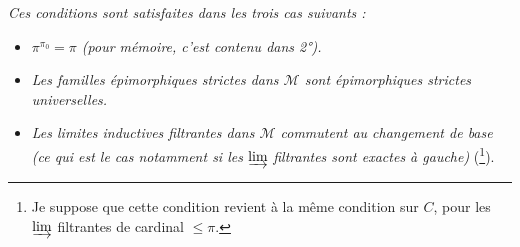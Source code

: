 \textit{Ces conditions sont satisfaites dans les trois cas suivants :}
\begin{itemize}
\item[\textit{A)}] \textit{$\pi^{\pi_0} = \pi$ (pour mémoire, c'est contenu dans 2°).}
\item[\textit{B)}] \textit{Les familles épimorphiques strictes dans $\mathcal{M}$ sont épimorphiques strictes universelles.}
\item[\textit{C)}] \textit{Les limites inductives filtrantes dans $\mathcal{M}$ commutent au changement de base (ce qui est le cas notamment si les} $\varinjlim$ \textit{filtrantes sont exactes à gauche)} (\footnote{Je suppose que cette condition revient à la même condition sur $C$, pour les $\varinjlim$ filtrantes de cardinal $\leqslant \pi$.}).
\end{itemize}

